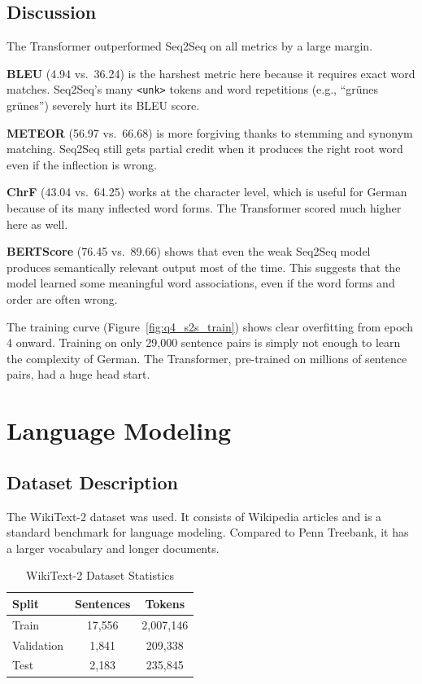 \documentclass[12pt,a4paper]{article}
\begin{document}
\subsection{Discussion}

The Transformer outperformed Seq2Seq on all metrics by a large margin.

\textbf{BLEU} (4.94 vs.\ 36.24) is the harshest metric here because it requires
exact word matches. Seq2Seq's many \texttt{<unk>} tokens and word repetitions
(e.g., ``grünes grünes'') severely hurt its BLEU score.

\textbf{METEOR} (56.97 vs.\ 66.68) is more forgiving thanks to stemming and
synonym matching. Seq2Seq still gets partial credit when it produces the right
root word even if the inflection is wrong.

\textbf{ChrF} (43.04 vs.\ 64.25) works at the character level, which is useful
for German because of its many inflected word forms. The Transformer scored much
higher here as well.

\textbf{BERTScore} (76.45 vs.\ 89.66) shows that even the weak Seq2Seq model
produces semantically relevant output most of the time. This suggests that the
model learned some meaningful word associations, even if the word forms and
order are often wrong.

The training curve (Figure~\ref{fig:q4_s2s_train}) shows clear overfitting
from epoch 4 onward. Training on only 29{,}000 sentence pairs is simply not
enough to learn the complexity of German. The Transformer, pre-trained on
millions of sentence pairs, had a huge head start.

\section{Language Modeling}

\subsection{Dataset Description}

The WikiText-2 dataset \cite{merity2016wikitext} was used. It consists of
Wikipedia articles and is a standard benchmark for language modeling. Compared
to Penn Treebank, it has a larger vocabulary and longer documents.

\begin{table}[H]
    \centering
    \caption{WikiText-2 Dataset Statistics}
    \begin{tabular}{lcc}
        \toprule
        \textbf{Split} & \textbf{Sentences} & \textbf{Tokens} \\
        \midrule
        Train      & 17{,}556 & 2{,}007{,}146 \\
        Validation &  1{,}841 &   209{,}338   \\
        Test       &  2{,}183 &   235{,}845   \\
        \bottomrule
    \end{tabular}
    \label{tab:q5_dataset}
\end{table}
\end{document}
